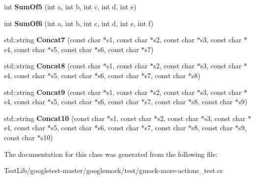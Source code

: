 \begin{DoxyCompactItemize}
\item 
\mbox{\label{classtesting_1_1gmock__more__actions__test_1_1Foo_a55fb0cdc224c450f401e0fea4f979512}} 
int {\bfseries Sum\+Of5} (int a, int b, int c, int d, int e)
\item 
\mbox{\label{classtesting_1_1gmock__more__actions__test_1_1Foo_a34b5ae7cd4620331af92c637e3534bc4}} 
int {\bfseries Sum\+Of6} (int a, int b, int c, int d, int e, int f)
\item 
\mbox{\label{classtesting_1_1gmock__more__actions__test_1_1Foo_a5ff9313371e65a91b086afdc2032b0eb}} 
std\+::string {\bfseries Concat7} (const char $\ast$s1, const char $\ast$s2, const char $\ast$s3, const char $\ast$s4, const char $\ast$s5, const char $\ast$s6, const char $\ast$s7)
\item 
\mbox{\label{classtesting_1_1gmock__more__actions__test_1_1Foo_a25b91cea8633d026fe3f4a36c1574b8e}} 
std\+::string {\bfseries Concat8} (const char $\ast$s1, const char $\ast$s2, const char $\ast$s3, const char $\ast$s4, const char $\ast$s5, const char $\ast$s6, const char $\ast$s7, const char $\ast$s8)
\item 
\mbox{\label{classtesting_1_1gmock__more__actions__test_1_1Foo_a8f5b145b0cd23055630b2f9d10b3f45b}} 
std\+::string {\bfseries Concat9} (const char $\ast$s1, const char $\ast$s2, const char $\ast$s3, const char $\ast$s4, const char $\ast$s5, const char $\ast$s6, const char $\ast$s7, const char $\ast$s8, const char $\ast$s9)
\item 
\mbox{\label{classtesting_1_1gmock__more__actions__test_1_1Foo_ad5b1d2dd1bcec98fdc90a05487ec3b14}} 
std\+::string {\bfseries Concat10} (const char $\ast$s1, const char $\ast$s2, const char $\ast$s3, const char $\ast$s4, const char $\ast$s5, const char $\ast$s6, const char $\ast$s7, const char $\ast$s8, const char $\ast$s9, const char $\ast$s10)
\end{DoxyCompactItemize}


The documentation for this class was generated from the following file\+:\begin{DoxyCompactItemize}
\item 
Test\+Lib/googletest-\/master/googlemock/test/gmock-\/more-\/actions\+\_\+test.\+cc\end{DoxyCompactItemize}
